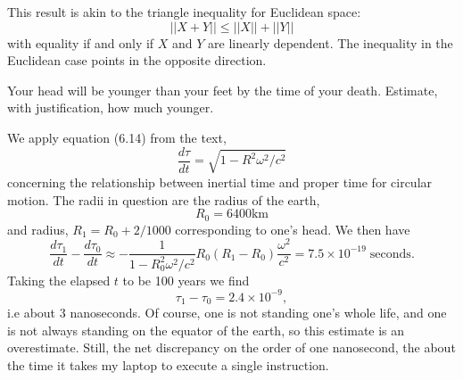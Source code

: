 \documentclass[minion]{homework}
\begin{document}
\begin{aproblems}
This result is akin to the triangle inequality for Euclidean space:
\begin{equation}
||X+Y|| \le ||X|| + ||Y||
\end{equation}
with equality if and only if $X$ and $Y$ are linearly dependent.  The 
inequality in the Euclidean case points in the opposite direction.


 Your head will be younger than your feet by the time of your death.  Estimate, with justification, how much younger.

\solution
We apply equation (6.14) from the text,
\begin{equation}
\frac{d\tau}{dt} = \sqrt{1-R^2\omega^2/c^2}
\end{equation}
concerning the relationship between inertial time and proper time
for circular motion. The radii in question are the radius of the earth,
\begin{equation}
R_0=6400\mathrm{km}
\end{equation}
and radius, $R_1=R_0 + 2/1000$ corresponding to one's head.  We then have
\begin{equation}
\frac{d\tau_1}{dt}-\frac{d\tau_0}{dt} \approx -\frac{1}{1-R_0^2\omega^2/c^2} R_0(R_1-R_0)\frac{\omega^2}{c^2}=7.5\times 10^{-19}\;\mathrm{seconds.}
\end{equation}
Taking the elapsed $t$ to be 100 years we find
\begin{equation}
\tau_1-\tau_0 = 2.4\times 10^{-9},
\end{equation}
i.e about 3 nanoseconds. Of course, one is not standing one's whole life, and one is not always standing on the equator of the earth, so this estimate is an overestimate. Still, the net 
discrepancy on the order of one nanosecond, the about the time it takes my laptop to execute a single instruction.


\end{aproblems}
\end{document}
